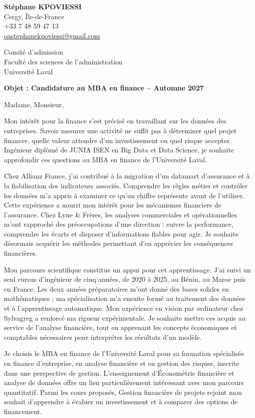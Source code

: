 \documentclass[12pt,a4paper]{article}
\begin{document}
\thispagestyle{empty}
\textbf{Stéphane KPOVIESSI}\\
{\small Cergy, Île-de-France\\
+33 7 48 59 47 13\\
\href{mailto:oastephanekpoviessi@gmail.com}{oastephanekpoviessi@gmail.com}}

\vspace{0.4em}
Comité d'admission\\
Faculté des sciences de l'administration\\
Université Laval

\vspace{0.3em}
\textbf{Objet : Candidature au MBA en finance -- Automne 2027}

Madame, Monsieur,

Mon intérêt pour la finance s'est précisé en travaillant sur les données des entreprises. Savoir mesurer une activité ne suffit pas à déterminer quel projet financer, quelle valeur attendre d'un investissement ou quel risque accepter. Ingénieur diplômé de JUNIA ISEN en Big Data et Data Science, je souhaite approfondir ces questions au MBA en finance de l'Université Laval.

Chez Allianz France, j'ai contribué à la migration d'un datamart d'assurance et à la fiabilisation des indicateurs associés. Comprendre les règles métier et contrôler les données m'a appris à examiner ce qu'un chiffre représente avant de l'utiliser. Cette expérience a nourri mon intérêt pour les mécanismes financiers de l'assurance. Chez Lyne \& Frères, les analyses commerciales et opérationnelles m'ont rapproché des préoccupations d'une direction : suivre la performance, comprendre les écarts et disposer d'informations fiables pour agir. Je souhaite désormais acquérir les méthodes permettant d'en apprécier les conséquences financières.

Mon parcours scientifique constitue un appui pour cet apprentissage. J'ai suivi un seul cursus d'ingénieur de cinq années, de 2020 à 2025, au Bénin, au Maroc puis en France. Les deux années préparatoires m'ont donné des bases solides en mathématiques ; ma spécialisation m'a ensuite formé au traitement des données et à l'apprentissage automatique. Mon expérience en vision par ordinateur chez Sylvagreg a renforcé ma rigueur expérimentale. Je souhaite mettre ces acquis au service de l'analyse financière, tout en apprenant les concepts économiques et comptables nécessaires pour interpréter les résultats d'un modèle.

Je choisis le MBA en finance de l'Université Laval pour sa formation spécialisée en finance d'entreprise, en analyse financière et en gestion des risques, inscrite dans une perspective de gestion. L'enseignement d'Économétrie financière et analyse de données offre un lien particulièrement intéressant avec mon parcours quantitatif. Parmi les cours proposés, Gestion financière de projets rejoint mon souhait d'apprendre à évaluer un investissement et à comparer des options de financement.
\end{document}
